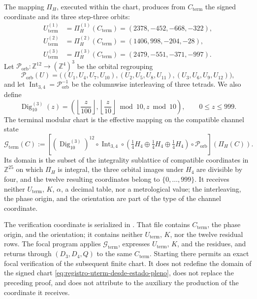 The mapping \(\Pi_H\), executed within the chart, produces from
\(C_{\mathrm{term}}\) the signed coordinate and its three step-three orbits:
\begin{align*}
 U_{\mathrm{term}}^{(1)}&=\Pi_H^{(1)}(C_{\mathrm{term}})
                         =(2378,-452,-668,-322),\\
 U_{\mathrm{term}}^{(2)}&=\Pi_H^{(2)}(C_{\mathrm{term}})
                         =(1406,998,-204,-28),\\
 U_{\mathrm{term}}^{(3)}&=\Pi_H^{(3)}(C_{\mathrm{term}})
                         =(2479,-551,-371,-997).
\end{align*}
Let \(\mathcal P_{\mathrm{orb}}:\mathbb Z^{12}\to(\mathbb Z^4)^3\) be the
orbital regrouping
\[
 \mathcal P_{\mathrm{orb}}(U)
 =\bigl((U_1,U_4,U_7,U_{10}),
        (U_2,U_5,U_8,U_{11}),
        (U_3,U_6,U_9,U_{12})\bigr),
\]
and let \(\operatorname{Int}_{3,4}=\mathcal P_{\mathrm{orb}}^{-1}\) be the
columnwise interleaving of three tetrads. We also define
\[
 \operatorname{Dig}_{10}^{(3)}(z)
 =\left(\left\lfloor\frac z{100}\right\rfloor,
         \left\lfloor\frac z{10}\right\rfloor\bmod10,
         z\bmod10\right),\qquad0\le z\le999.
\]
The terminal modular chart is the effective mapping on the compatible channel
state
\begin{equation}
 \mathcal G_{\mathrm{term}}(C)
 :=\left[(\operatorname{Dig}_{10}^{(3)})^{12}
 \circ\operatorname{Int}_{3,4}
 \circ\left(\tfrac14H_4\oplus\tfrac14H_4
                    \oplus\tfrac14H_4\right)
  \circ\mathcal P_{\mathrm{orb}}\right]\!\left(\Pi_H(C)\right).
 \label{eq:registro-generador-modular-terminal}
\end{equation}
Its domain is the subset of the integrality sublattice of compatible
coordinates in \(\mathbb Z^{25}\) on which \(\Pi_H\) is integral, the three
orbital images under \(H_4\) are divisible by four, and the twelve resulting
coordinates belong to \(\{0,\ldots,999\}\). It receives neither
\(U_{\mathrm{term}}\), \(K\), \(\alpha\), a decimal table, nor a metrological
value; the interleaving, the phase origin, and the orientation are part of the
type of the channel coordinate.

The verification coordinate is serialized in
. That file contains
\(C_{\mathrm{term}}\), the phase origin, and the orientation; it contains
neither \(U_{\mathrm{term}}\), \(K\), nor the twelve residual rows. The focal
program applies \(\mathcal G_{\mathrm{term}}\), expresses
\(U_{\mathrm{term}}\), \(K\), and the residues, and returns through
\((D_3,D_4,Q)\) to the same \(C_{\mathrm{term}}\). Starting there permits an
exact focal verification of the subsequent finite chart. It does not redefine
the domain of the signed chart
\eqref{eq:registro-uterm-desde-estado-pleno}, does not replace the preceding
proof, and does not attribute to the auxiliary the production of the
coordinate it receives.

